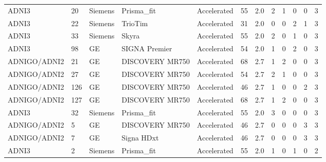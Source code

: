 \documentclass{article}
\providecommand{\DIFaddtex}[1]{{\protect\color{blue}#1}} %
\providecommand{\DIFadd}[1]{\texorpdfstring{\DIFaddtex{#1}}{#1}} %
\begin{document}
\begin{landscape}
\begin{longtable}{lllllrrrrrrr}
\DIFadd{ADNI3 }& \DIFadd{20 }& \DIFadd{Siemens }& \DIFadd{Prisma\_fit }& \DIFadd{Accelerated }& \DIFadd{55 }& \DIFadd{2.0 }& \DIFadd{2 }& \DIFadd{1 }& \DIFadd{0 }& \DIFadd{0 }& \DIFadd{3 }\\
\DIFadd{ADNI3 }& \DIFadd{22 }& \DIFadd{Siemens }& \DIFadd{TrioTim }& \DIFadd{Accelerated }& \DIFadd{31 }& \DIFadd{2.0 }& \DIFadd{0 }& \DIFadd{0 }& \DIFadd{2 }& \DIFadd{1 }& \DIFadd{3 }\\
\DIFadd{ADNI3 }& \DIFadd{33 }& \DIFadd{Siemens }& \DIFadd{Skyra }& \DIFadd{Accelerated }& \DIFadd{55 }& \DIFadd{2.0 }& \DIFadd{2 }& \DIFadd{0 }& \DIFadd{1 }& \DIFadd{0 }& \DIFadd{3 }\\
\DIFadd{ADNI3 }& \DIFadd{98 }& \DIFadd{GE }& \DIFadd{SIGNA Premier }& \DIFadd{Accelerated }& \DIFadd{54 }& \DIFadd{2.0 }& \DIFadd{1 }& \DIFadd{0 }& \DIFadd{2 }& \DIFadd{0 }& \DIFadd{3 }\\
\DIFadd{ADNIGO/ADNI2 }& \DIFadd{21 }& \DIFadd{GE }& \DIFadd{DISCOVERY MR750 }& \DIFadd{Accelerated }& \DIFadd{68 }& \DIFadd{2.7 }& \DIFadd{1 }& \DIFadd{2 }& \DIFadd{0 }& \DIFadd{0 }& \DIFadd{3 }\\
\DIFadd{ADNIGO/ADNI2 }& \DIFadd{27 }& \DIFadd{GE }& \DIFadd{DISCOVERY MR750 }& \DIFadd{Accelerated }& \DIFadd{54 }& \DIFadd{2.7 }& \DIFadd{2 }& \DIFadd{1 }& \DIFadd{0 }& \DIFadd{0 }& \DIFadd{3 }\\
\DIFadd{ADNIGO/ADNI2 }& \DIFadd{126 }& \DIFadd{GE }& \DIFadd{DISCOVERY MR750 }& \DIFadd{Accelerated }& \DIFadd{46 }& \DIFadd{2.7 }& \DIFadd{1 }& \DIFadd{0 }& \DIFadd{0 }& \DIFadd{2 }& \DIFadd{3 }\\
\DIFadd{ADNIGO/ADNI2 }& \DIFadd{127 }& \DIFadd{GE }& \DIFadd{DISCOVERY MR750 }& \DIFadd{Accelerated }& \DIFadd{68 }& \DIFadd{2.7 }& \DIFadd{1 }& \DIFadd{2 }& \DIFadd{0 }& \DIFadd{0 }& \DIFadd{3 }\\
\DIFadd{ADNI3 }& \DIFadd{32 }& \DIFadd{Siemens }& \DIFadd{Prisma\_fit }& \DIFadd{Accelerated }& \DIFadd{55 }& \DIFadd{2.0 }& \DIFadd{3 }& \DIFadd{0 }& \DIFadd{0 }& \DIFadd{0 }& \DIFadd{3 }\\
\DIFadd{ADNIGO/ADNI2 }& \DIFadd{5 }& \DIFadd{GE }& \DIFadd{DISCOVERY MR750 }& \DIFadd{Accelerated }& \DIFadd{46 }& \DIFadd{2.7 }& \DIFadd{0 }& \DIFadd{0 }& \DIFadd{0 }& \DIFadd{3 }& \DIFadd{3 }\\
\DIFadd{ADNIGO/ADNI2 }& \DIFadd{7 }& \DIFadd{GE }& \DIFadd{Signa HDxt }& \DIFadd{Accelerated }& \DIFadd{46 }& \DIFadd{2.7 }& \DIFadd{0 }& \DIFadd{0 }& \DIFadd{0 }& \DIFadd{3 }& \DIFadd{3 }\\
\DIFadd{ADNI3 }& \DIFadd{2 }& \DIFadd{Siemens }& \DIFadd{Prisma\_fit }& \DIFadd{Accelerated }& \DIFadd{55 }& \DIFadd{2.0 }& \DIFadd{1 }& \DIFadd{0 }& \DIFadd{1 }& \DIFadd{0 }& \DIFadd{2 }\\

\end{longtable}
\end{landscape}
\end{document}
